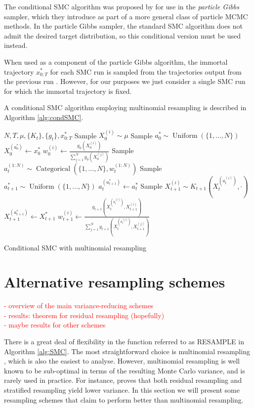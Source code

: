 \documentclass[fleqn]{article}
\newcommand{\Cat}{\operatorname{Categorical}}
\newcommand{\Unif}{\operatorname{Uniform}}
\begin{document}
The conditional SMC algorithm was proposed by \citet{andrieu2010} for use in the \emph{particle Gibbs} sampler, which they introduce as part of a more general class of particle MCMC methods. 
In the particle Gibbs sampler, the standard SMC algorithm does not admit the desired target distribution, so this conditional version must be used instead.

When used as a component of the particle Gibbs algorithm, the immortal trajectory $x_{0:T}^*$ for each SMC run is sampled from the trajectories output from the previous run \citep[Section 2.4.3]{andrieu2010}. However, for our purposes we just consider a single SMC run for which the immortal trajectory is fixed.

A conditional SMC algorithm employing multinomial resampling is described in Algorithm \ref{alg:condSMC}.

\begin{algorithm}
\begin{algorithmic}[1]
\Require $N, T, \mu, \{K_t\}, \{g_t\}, x_{0:T}^*$
	\State Sample $X_0^{(i)} \sim \mu$ 
\EndFor
\State Sample $a_0^* \sim \Unif(\{1,\dots,N\})$
\State $X_0^{(a_0^*)} \gets x_0^*$
	\State $w_0^{(i)} \gets \frac{g_0(X_0^{(i)})}{\sum_{j=1}^N g_0(X_0^{(j)})}$
\EndFor
{}
	\State Sample $a_t^{(1:N)} \sim \Cat(\{1,\dots,N\}, w_t^{(1:N)})$
	\State Sample $a_{t+1}^* \sim \Unif(\{1,\dots,N\})$
	\State $a_t^{(a_{t+1}^*)} \gets a_t^*$
		\State Sample $X_{t+1}^{(i)} \sim K_{t+1}(X_t^{(a_t^{(i)})}, \cdot)$
	\EndFor
	\State $X_{t+1}^{(a_{t+1}^*)} \gets X_{t+1}^*$
		\State $w_{t+1}^{(i)} \gets \frac{g_{t+1}(X_t^{(a_t^{(i)})} , X_{t+1}^{(i)})}{\sum_{j=1}^N g_{t+1}(X_t^{(a_t^{(j)})} , X_{t+1}^{(j)})}$
	\EndFor
\EndFor
\end{algorithmic}
\caption{Conditional SMC with multinomial resampling}
\label{alg:condSMC}
\end{algorithm}

\section{Alternative resampling schemes}\label{sec:resampling}
\textcolor{red}{
- overview of the main variance-reducing schemes\\
- results: theorem for residual resampling (hopefully)\\
- maybe results for other schemes
}

There is a great deal of flexibility in the function referred to as {\footnotesize RESAMPLE} in Algorithm \ref{alg:SMC}. The most straightforward choice is multinomial resampling \citep{efron1994}, which is also the easiest to analyse. However, multinomial resampling is well known to be sub-optimal in terms of the resulting Monte Carlo variance, and is rarely used in practice. For instance, \citet{douc2005} proves that both residual resampling and stratified resampling yield lower variance. 
In this section we will present some resampling schemes that claim to perform better than multinomial resampling.
\end{document}
